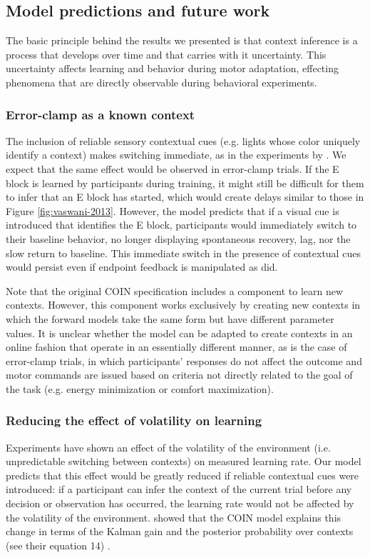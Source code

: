\documentclass[a4paper,doc,floatsintext,natbib]{apa6}%
\def \fref #1{Figure \ref{#1}}     %
\begin{document}
\subsection{Model predictions and future work}
The basic principle behind the results we presented is that context inference is a process that develops over time and that carries with it uncertainty. This uncertainty affects learning and behavior during motor adaptation, effecting phenomena that are directly observable during behavioral experiments.

\subsubsection{Error-clamp as a known context}
The inclusion of reliable sensory contextual cues (e.g. lights whose color uniquely identify a context) makes switching immediate, as in the experiments by \cite{Kim_Neural_2015}. We expect that the same effect would be observed in error-clamp trials. If the E block is learned by participants during training, it might still be difficult for them to infer that an E block has started, which would create delays similar to those in \fref{fig:vaswani-2013}. However, the model predicts that if a visual cue is introduced that identifies the E block, participants would immediately switch to their baseline behavior, no longer displaying spontaneous recovery, lag, nor the slow return to baseline. This immediate switch in the presence of contextual cues would persist even if endpoint feedback is manipulated as \cite{Vaswani_Decay_2013} did.

Note that the original COIN specification includes a component to learn new contexts. However, this component works exclusively by creating new contexts in which the forward models take the same form but have different parameter values. It is unclear whether the model can be adapted to create contexts in an online fashion that operate in an essentially different manner, as is the case of error-clamp trials, in which participants' responses do not affect the outcome and motor commands are issued based on criteria not directly related to the goal of the task (e.g. energy minimization or comfort maximization).

\subsubsection{Reducing the effect of volatility on learning}
Experiments \citep{Herzfeld_memory_2014} have shown an effect of the volatility of the environment (i.e. unpredictable switching between contexts) on measured learning rate. Our model predicts that this effect would be greatly reduced if reliable contextual cues were introduced: if a participant can infer the context of the current trial before any decision or observation has occurred, the learning rate would not be affected by the volatility of the environment. \cite{Heald_Contextual_2021} showed that the COIN model explains this change in terms of the Kalman gain and the posterior probability over contexts (see their equation 14) .
\end{document}
